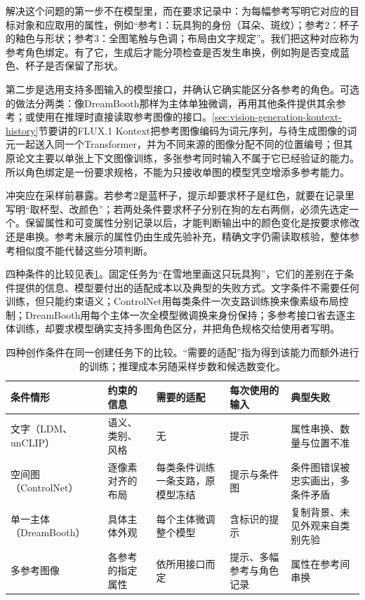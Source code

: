 解决这个问题的第一步不在模型里，而在要求记录中：为每幅参考写明它对应的目标对象和应取用的属性，例如“参考1：玩具狗的身份（耳朵、斑纹）；参考2：杯子的釉色与形状；参考3：全图笔触与色调；布局由文字规定”。我们把这种对应称为参考角色绑定。有了它，生成后才能分项检查是否发生串换，例如狗是否变成蓝色、杯子是否保留了形状。

第二步是选用支持多图输入的模型接口，并确认它确实能区分各参考的角色。可选的做法分两类：像DreamBooth那样为主体单独微调，再用其他条件提供其余参考；或使用在推理时直接读取参考图像的接口。\ref{sec:vision-generation-kontext-history}节要讲的FLUX.1 Kontext把参考图像编码为词元序列，与待生成图像的词元一起送入同一个Transformer，并为不同来源的图像分配不同的位置编号；但其原论文主要以单张上下文图像训练，多张参考同时输入不属于它已经验证的能力。所以角色绑定是一份要求规格，不能为只接收单图的模型凭空增添多参考能力。

冲突应在采样前暴露。若参考2是蓝杯子，提示却要求杯子是红色，就要在记录里写明“取杯型、改颜色”；若两处条件要求杯子分别在狗的左右两侧，必须先选定一个。保留属性和可变属性分别记录以后，才能判断输出中的颜色变化是按要求修改还是串换。参考未展示的属性仍由生成先验补充，精确文字仍需读取核验，整体参考相似度不能代替这些分项判断。

四种条件的比较见表\ref{tab:vision-generation-condition-comparison}。固定任务为“在雪地里画这只玩具狗”，它们的差别在于条件提供的信息、模型要付出的适配成本以及典型的失败方式。文字条件不需要任何训练，但只能约束语义；ControlNet用每类条件一次支路训练换来像素级布局控制；DreamBooth用每个主体一次全模型微调换来身份保持；多参考接口省去逐主体训练，却要求模型确实支持多图角色区分，并把角色规格交给使用者写明。

\begin{table}[htbp]
 \centering
 \small
 \begin{tabularx}{\linewidth}{@{}l X X X X@{}}
  \toprule
  条件情形 & 约束的信息 & 需要的适配 & 每次使用的输入 & 典型失败\\
  \midrule
  文字（LDM、unCLIP） & 语义、类别、风格 & 无 & 提示 & 属性串换、数量与位置不准\\
  空间图（ControlNet） & 逐像素对齐的布局 & 每类条件训练一条支路，原模型冻结 & 提示与条件图 & 条件图错误被忠实画出，多条件矛盾\\
  单一主体（DreamBooth） & 具体主体外观 & 每个主体微调整个模型 & 含标识的提示 & 复制背景、未见外观来自类别先验\\
  多参考图像 & 各参考的指定属性 & 依所用接口而定 & 提示、多幅参考与角色记录 & 属性在参考间串换\\
  \bottomrule
 \end{tabularx}
 \caption{四种创作条件在同一创建任务下的比较。“需要的适配”指为得到该能力而额外进行的训练；推理成本另随采样步数和候选数变化。}
 \label{tab:vision-generation-condition-comparison}
\end{table}

